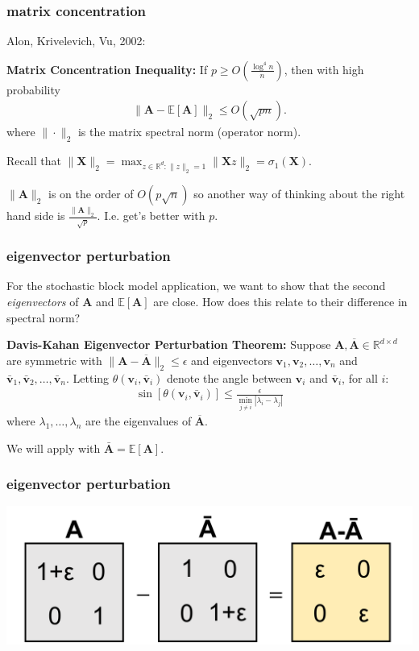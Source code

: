 \documentclass[compress]{beamer}
\newcommand{\bv}[1]{\mathbf{#1}}
\newcommand{\R}{\mathbb{R}}
\newcommand{\E}{\mathbb{E}}
\newcommand{\norm}[1]{\|#1\|}
\begin{document}
\begin{frame}
	\frametitle{matrix concentration}
	Alon, Krivelevich, Vu, 2002:
	\begin{tcolorbox}[colback=green!5,colframe=green!40!black]
		\textbf{Matrix Concentration Inequality:}
		If $p \ge O \left ( \frac{\log^4 n}{n} \right )$, then with high probability
		\begin{align*}
		\norm{\bv A - \E[\bv A]}_2 \le O(\sqrt{pn}).
		\end{align*}
		where $\norm{\cdot}_2$ is the matrix \alert{spectral} norm (operator norm).
	\end{tcolorbox}
	Recall that $\norm{\bv{X}}_2 = \max_{z\in\R^d: \norm{z}_2 = 1} \norm{\bv X z}_2 = \sigma_1(\bv{X})$. 
	
	$\|\bv{A}\|_2$ is on the order of $O(p\sqrt{n})$ so another way of thinking about the right hand side is $\frac{\|\bv{A}\|_2}{\sqrt{p}}$. I.e. get's better with $p$.
\end{frame}


\begin{frame}
	\frametitle{eigenvector perturbation}
			For the stochastic block model application, we want to show that the second \emph{eigenvectors} of $\bv{A}$ and $\E[\bv{A}]$ are close. How does this relate to their difference in spectral norm?
	
	\begin{tcolorbox}[colback=green!5,colframe=green!40!black]
		\textbf{Davis-Kahan Eigenvector Perturbation Theorem:}
		Suppose $\bv{A},\bv{\overline A} \in \R^{d \times d}$ are symmetric with $\norm{\bv{A}-\bv{\overline A}}_2 \le \epsilon$ and eigenvectors $\bv{v}_1,\bv{v}_2,\ldots, \bv{v}_n$ and $\bar{\bv{v}}_1,\bar{\bv{v}}_2,\ldots, \bar{\bv{v}}_n$. Letting $\theta(\bv{v}_i,\bar{\bv{v}}_i)$ denote the angle between $\bv{v}_i$ and $\bar{\bv{v}}_i$, for all $i$:
		\begin{align*}
		\sin [\theta(\bv{v}_i, \bar{\bv{v}}_i)] \le \frac{\epsilon}{\min_{j \neq i} |\lambda_i - \lambda_j|}
		\end{align*}
		where $\lambda_1,\ldots,\lambda_n$ are the eigenvalues of $\bv{\overline A}$.
	\end{tcolorbox}
	We will apply with $\bar{\bv{A}} = \E[\bv{A}]$. 
\end{frame}

\begin{frame}
	\frametitle{eigenvector perturbation}
	\begin{center}
		\includegraphics[width=.8\textwidth]{flip.png}
	\end{center}
	\vspace{13em}
\end{frame}
\end{document}
